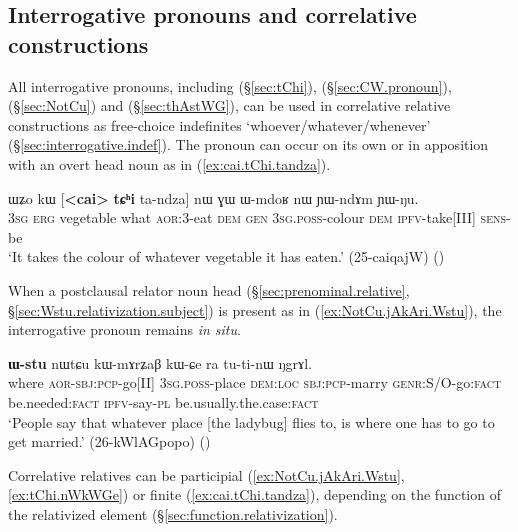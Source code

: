   
\subsection{Interrogative pronouns and correlative constructions} \label{sec:interrogative.relative}
All interrogative pronouns, including   (§\ref{sec:tChi}),  (§\ref{sec:CW.pronoun}),   (§\ref{sec:NotCu}) and  (§\ref{sec:thAstWG}), can be used in correlative relative constructions as free-choice indefinites `whoever/whatever/whenever' (§\ref{sec:interrogative.indef}). The pronoun can occur on its own or in apposition with an overt head noun as in (\ref{ex:cai.tChi.tandza}).

\begin{exe}
\ex \label{ex:cai.tChi.tandza}
\gll ɯʑo kɯ [\textbf{<cai>} \textbf{tɕʰi} ta-ndza] nɯ ɣɯ ɯ-mdoʁ nɯ ɲɯ-ndɤm ɲɯ-ŋu. \\
\textsc{3sg} \textsc{erg} vegetable what \textsc{aor}:3\flobv{}-eat \textsc{dem} \textsc{gen} \textsc{3sg}.\textsc{poss}-colour \textsc{dem} \textsc{ipfv}-take[III] \textsc{sens}-be \\
\glt  `It takes the colour of whatever vegetable it has eaten.' (25-caiqajW)
()
\end{exe}

When a postclausal relator noun head (§\ref{sec:prenominal.relative}, §\ref{sec:Wstu.relativization.subject}) is present as in (\ref{ex:NotCu.jAkAri.Wstu}), the interrogative pronoun remains \textit{in situ}.

\begin{exe}
\ex \label{ex:NotCu.jAkAri.Wstu}
 \textbf{ɯ-stu} nɯtɕu kɯ-mɤrʑaβ kɯ-ɕe ra tu-ti-nɯ ŋgrɤl. \\
where \textsc{aor}-\textsc{sbj}:\textsc{pcp}-go[II] \textsc{3sg}.\textsc{poss}-place \textsc{dem}:\textsc{loc} \textsc{sbj}:\textsc{pcp}-marry \textsc{genr}:S/O-go:\textsc{fact} be.needed:\textsc{fact} \textsc{ipfv}-say-\textsc{pl} be.usually.the.case:\textsc{fact} \\
\glt `People say that whatever place [the ladybug] flies to, is where one has to go to get married.' (26-kWlAGpopo)
()
\end{exe}

Correlative relatives can be participial (\ref{ex:NotCu.jAkAri.Wstu}, \ref{ex:tChi.nWkWGe}) or finite (\ref{ex:cai.tChi.tandza}), depending on the function of the relativized element (§\ref{sec:function.relativization}).

